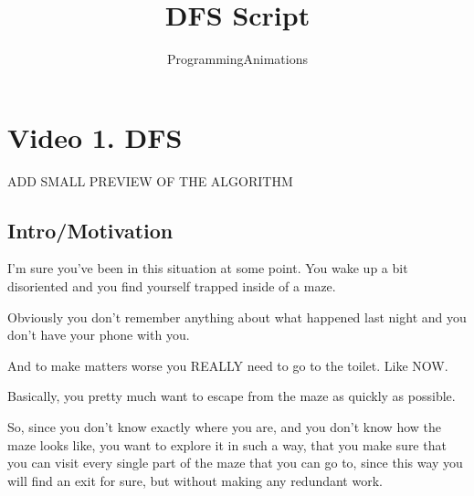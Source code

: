 \documentclass[12pt]{article}
\author{ProgrammingAnimations}
\title{DFS Script}
\date{}
\begin{document}
\maketitle


\section{Video 1. DFS}

ADD SMALL PREVIEW OF THE ALGORITHM

\subsection{Intro/Motivation}

I'm sure you've been in this situation at some point.
You wake up a bit disoriented and you find yourself trapped
inside of a maze.

Obviously you don't remember anything about what happened
last night and you don't have your phone with you.

And to make matters worse
you REALLY need to go to the toilet. Like NOW.

Basically, you pretty much want to
escape from the maze as quickly as possible.

So, since you don't know exactly where you are,
and you don't know how the maze looks like,
you want to explore it in such a way, that you make sure
that you can visit every single part of the maze that you
can go to, since this way you will find an exit for sure,
but without making any redundant work.
\end{document}
